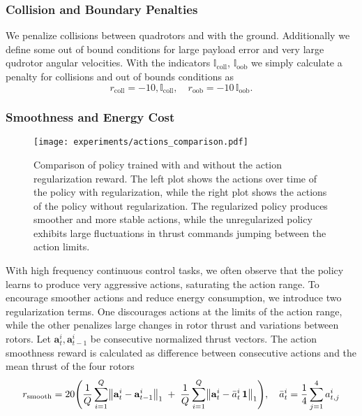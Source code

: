 \subsubsection{Collision and Boundary Penalties}
We penalize collisions between quadrotors and with the ground. Additionally we define some out of bound conditions for large payload error and very large qudrotor angular velocities.
With the indicators \(\mathbb{I}_{\mathrm{coll}}\), \(\mathbb{I}_{\mathrm{oob}}\) we simply calculate a penalty for collisions and out of bounds conditions as
\begin{equation}
r_{\mathrm{coll}} = -10,\mathbb{I}_{\mathrm{coll}}, 
\quad
r_{\mathrm{oob}} = -10\,\mathbb{I}_{\mathrm{oob}}.
\end{equation}

\subsubsection{Smoothness and Energy Cost}
\begin{figure}[ht]
    \centering
    \texttt{[image: experiments/actions\_comparison.pdf]}
    \caption[Action regularization]{Comparison of policy trained with and without the action regularization reward. The left plot shows the actions over time of the policy with regularization, while the right plot shows the actions of the policy without regularization. The regularized policy produces smoother and more stable actions, while the unregularized policy exhibits large fluctuations in thrust commands jumping between the action limits.}
    \label{fig:actions_comparison}  
\end{figure}
With high frequency continuous control tasks, we often observe that the policy learns to produce very aggressive actions, saturating the action range. To encourage smoother actions and reduce energy consumption, we introduce two regularization terms. One discourages actions at the limits of the action range, while the other penalizes large changes in rotor thrust and variations between rotors. Let \(\mathbf{a}_t^i,\mathbf{a}_{t-1}^i\) be consecutive normalized thrust vectors. The action smoothness reward is calculated as difference between consecutive actions and the mean thrust of the four rotors
\begin{equation}
r_{\rm smooth} = 20
\Biggl(
\frac{1}{Q}\sum_{i=1}^Q \bigl\lVert \mathbf{a}_t^i - \mathbf{a}_{t-1}^i \bigr\rVert_1
\;+\;
\frac{1}{Q}\sum_{i=1}^Q \bigl\lVert \mathbf{a}_t^i - \bar a_t^i\,\mathbf{1}\bigr\rVert_1
\Biggr), \quad \bar a_t^i = \frac{1}{4}\sum_{j=1}^4 a_{t,j}^i
\end{equation}

